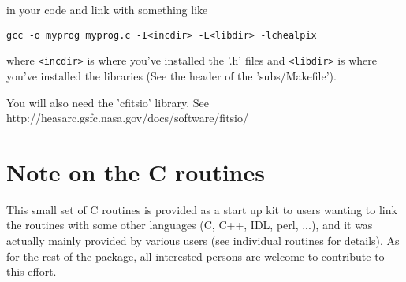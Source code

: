 \documentclass[12pt,twoside]{article}
\begin{document}
in your code and link with something like 
 
{\tt gcc -o myprog myprog.c -I<incdir> -L<libdir> -lchealpix}

where {\tt <incdir>} is where you've installed the '.h' files and 
{\tt <libdir>} is where you've installed the libraries (See the header of
the 'subs/Makefile').

You will also need the 'cfitsio' library. See \hfill \\
			{http://heasarc.gsfc.nasa.gov/docs/software/fitsio/}

\section[Note on the C routines]{{\Large Note on the C routines}}
This small set of C routines is provided as a start up kit to users wanting to
link the \healpix routines with some other languages (C, C++, IDL, perl, ...),
and it was actually mainly provided by various users (see individual routines
for details). As for the rest of the
\healpix package, all interested persons are welcome to contribute to this effort.

\newpage








\end{document}

